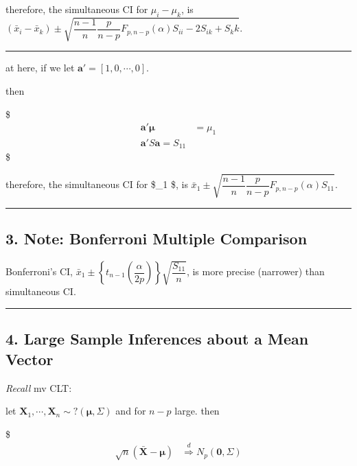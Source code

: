 \documentclass[
]{book}
\begin{document}
{{{therefore, the simultaneous CI for \(\mu_i - \mu_k\), is \((\bar x_i - \bar x_k ) \pm \sqrt{\dfrac{n-1}{n} \dfrac{p}{n-p} F_{p, n-p}(\alpha)S_{ii} -2 S_{ik} + S_kk}\).

\begin{center}\rule{0.5\linewidth}{0.5pt}\end{center}

at here, if we let \(\pmb a ' = [1, 0, \cdots, 0]\).

then

\$
\begin{align*}
\pmb a ' \pmb \mu &= \mu_1\\

\pmb a ' S \pmb a  =S_{11}
\end{align*}
\$

therefore, the simultaneous CI for \$\mu\_1 \$, is \(\bar x_1 \pm \sqrt{\dfrac{n-1}{n} \dfrac{p}{n-p} F_{p, n-p}(\alpha)S_{11}}\).

\begin{center}\rule{0.5\linewidth}{0.5pt}\end{center}

\hypertarget{note-bonferroni-multiple-comparison}{%
\subsection{3. Note: Bonferroni Multiple Comparison}\label{note-bonferroni-multiple-comparison}}

Bonferroni's CI, \(\bar x_1 \pm \left\{ t_{n-1} \left( \dfrac{\alpha}{2p} \right) \right\} \sqrt{\dfrac{S_11}{n}}\), is more precise (narrower) than simultaneous CI.

\begin{center}\rule{0.5\linewidth}{0.5pt}\end{center}

\hypertarget{large-sample-inferences-about-a-mean-vector}{%
\subsection{4. Large Sample Inferences about a Mean Vector}\label{large-sample-inferences-about-a-mean-vector}}

\emph{Recall} mv CLT:

let \(\pmb X_1 , \cdots, \pmb X_n {\sim} ?(\pmb \mu, \Sigma)\) and for \(n-p\) large. then

\$
\begin{align*}

\sqrt{n} (\bar {\pmb X} - \pmb \mu) &\overset {d}{\Longrightarrow} N_p (\pmb 0, \Sigma) \\



\end{align*}}}}
\end{document}
